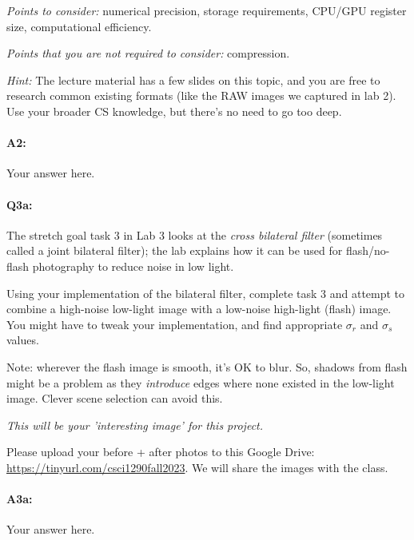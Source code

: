 \documentclass[11pt]{article}
\begin{document}
\emph{Points to consider:} numerical precision, storage requirements, CPU/GPU register size, computational efficiency.

\emph{Points that you are not \emph{required} to consider:} compression.

\emph{Hint:} The lecture material has a few slides on this topic, and you are free to research common existing formats (like the RAW images we captured in lab 2). Use your broader CS knowledge, but there's no need to go too deep.

\paragraph{A2:} Your answer here.





\pagebreak
\paragraph{Q3a:} 
The stretch goal task 3 in Lab 3 looks at the \emph{cross bilateral filter} (sometimes called a joint bilateral filter); the lab explains how it can be used for flash/no-flash photography to reduce noise in low light.

Using your implementation of the bilateral filter, complete task 3 and attempt to combine a high-noise low-light image with a low-noise high-light (flash) image. You might have to tweak your implementation, and find appropriate $\sigma_r$ and $\sigma_s$ values. 

Note: wherever the flash image is smooth, it's OK to blur. So, shadows from flash might be a problem as they \emph{introduce} edges where none existed in the low-light image. Clever scene selection can avoid this.

\emph{This will be your 'interesting image' for this project.}

Please upload your before + after photos to this Google Drive: \href{https://tinyurl.com/csci1290fall2023}{https://tinyurl.com/csci1290fall2023}. We will share the images with the class.

\paragraph{A3a:} Your answer here.



\pagebreak
\end{document}
